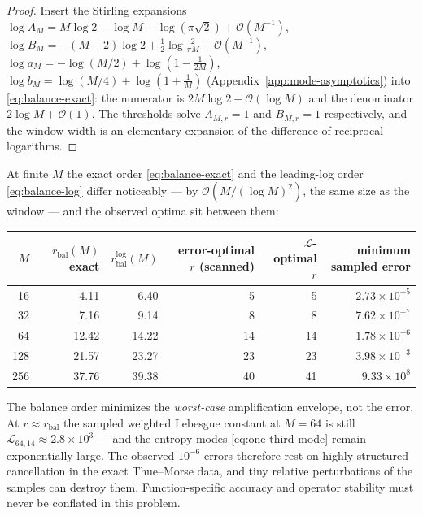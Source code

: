 \documentclass[11pt,oneside]{article}
\numberwithin{equation}{section}
\theoremstyle{definition}
\theoremstyle{remark}
\newcommand{\bigO}{\mathcal O}
\newcommand{\Leb}{\mathscr L}
\begin{document}
\begin{proof}
Insert the Stirling expansions
$\log A_M=M\log2-\log M-\log(\pi\sqrt2)+\bigO(M^{-1})$,
$\log B_M=-(M-2)\log2+\tfrac12\log\tfrac2{\pi M}+\bigO(M^{-1})$,
$\log a_M=-\log(M/2)+\log(1-\tfrac1{2M})$,
$\log b_M=\log(M/4)+\log(1+\tfrac1M)$
(Appendix~\ref{app:mode-asymptotics}) into \eqref{eq:balance-exact}: the
numerator is $2M\log2+\bigO(\log M)$ and the denominator
$2\log M+\bigO(1)$.  The thresholds solve
$A_{M,r}=1$ and $B_{M,r}=1$ respectively, and the window width is an
elementary expansion of the difference of reciprocal logarithms.
\end{proof}

At finite $M$ the exact order \eqref{eq:balance-exact} and the
leading-log order \eqref{eq:balance-log} differ noticeably --- by
$\bigO(M/(\log M)^2)$, the same size as the window --- and the
observed optima sit between them:

\begin{center}
\small
\begin{tabular}{rrrrrr}
\toprule
$M$ & $r_{\mathrm{bal}}(M)$ exact
 & $r^{\log}_{\mathrm{bal}}(M)$
 & error-optimal $r$ (scanned)
 & $\Leb$-optimal $r$
 & minimum sampled error \\
\midrule
16  & 4.11  & 6.40  & 5  & 5  & $2.73\times10^{-5}$ \\
32  & 7.16  & 9.14  & 8  & 8  & $7.62\times10^{-7}$ \\
64  & 12.42 & 14.22 & 14 & 14 & $1.78\times10^{-6}$ \\
128 & 21.57 & 23.27 & 23 & 23 & $3.98\times10^{-3}$ \\
256 & 37.76 & 39.38 & 40 & 41 & $9.33\times10^{8}$ \\
\bottomrule
\end{tabular}
\label{tab:balance}
\end{center}

\begin{warning}
The balance order minimizes the \emph{worst-case} amplification
envelope, not the error.  At $r\approx r_{\mathrm{bal}}$ the sampled
weighted Lebesgue constant at $M=64$ is still
$\Leb_{64,14}\approx2.8\times10^{3}$ --- and the entropy modes
\eqref{eq:one-third-mode} remain exponentially large.  The observed
$10^{-6}$ errors therefore rest on highly structured cancellation in
the exact Thue--Morse data, and tiny relative perturbations of the
samples can destroy them.  Function-specific accuracy and operator
stability must never be conflated in this problem.
\end{warning}
\end{document}
